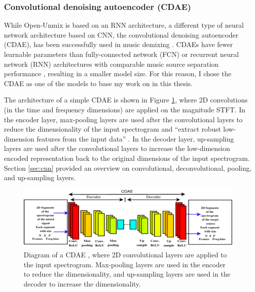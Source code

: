 \documentclass[report.tex]{subfiles}
\begin{document}
\subsubsection{Convolutional denoising autoencoder (CDAE)}
\label{sec:cdae}

While Open-Unmix is based on an RNN architecture, a different type of neural network architecture based on CNN, the convolutional denoising autoencoder (CDAE), has been successfully used in music demixing \parencite{plumbley1, plumbley2}. CDAEs have fewer learnable parameters than fully-connected network (FCN) or recurrent neural network (RNN) architectures with comparable music source separation performance \parencite{plumbley1}, resulting in a smaller model size. For this reason, I chose the CDAE as one of the models to base my work on in this thesis.

The architecture of a simple CDAE is shown in Figure \ref{fig:cdaes}, where 2D convolutions (in the time and frequency dimensions) are applied on the magnitude STFT. In the encoder layer, max-pooling layers are used after the convolutional layers to reduce the dimensionality of the input spectrogram and ``extract robust low-dimension features from the input data'' \parencite[1]{plumbley1}. In the decoder layer, up-sampling layers are used after the convolutional layers to increase the low-dimension encoded representation back to the original dimensions of the input spectrogram. Section \ref{sec:cnn} provided an overview on convolutional, deconvolutional, pooling, and up-sampling layers.

\begin{figure}[ht]
	\centering
	\includegraphics[width=\textwidth]{./images-neural/cdae_1.png}
	\caption{Diagram of a CDAE {\parencite[2]{plumbley1}}, where 2D convolutional layers are applied to the input spectrogram. Max-pooling layers are used in the encoder to reduce the dimensionality, and up-sampling layers are used in the decoder to increase the dimensionality.}
	\label{fig:cdaes}
\end{figure}
\end{document}
